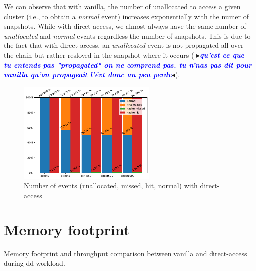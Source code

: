 \documentclass[sigplan,screen,10pt]{acmart}
\newcommand{\mynote}[2]{\fbox{\bfseries\sffamily\footnotesize{\textbf{#1}}}
 {\small$\blacktriangleright$\textsf{\emph{#2}}$\blacktriangleleft$}}
\newcommand{\mynote}[2]{}
\newcommand{\stella}[1]{\mynote{\textcolor{red}{Stella}}{\textcolor{blue}{\textbf{#1}}}}
\begin{document}
	We can observe that with vanilla, the number of unallocated to access a given cluster (i.e., to obtain a \emph{normal} event) increases exponentially with the numer of snapshots.
	While with direct-access, we almost always have the same number of \emph{unallocated} and \emph{normal} events regardless the number of snapshots.
	This is due to the fact that with direct-access, an \emph{unallocated} event is not propagated all over the chain but rather resloved in the snapshot where it occurs (\stella{qu'est ce que tu entends pas "propagated" on ne comprend pas. tu n'nas pas dit pour vanilla qu'on propageait l'évt donc un peu perdu}).
	
	\begin{figure}[h]
		\center
		\includegraphics[width=0.6\textwidth]{number_events_per_chain_di.pdf}
		\caption{Number of events (unallocated, missed, hit, normal) with direct-access.}
		\label{fig:fig37}
	\end{figure}


	\section*{Memory footprint}
	
	Memory footprint and throughput comparison between vanilla and direct-access during dd workload.
	
\end{document}
